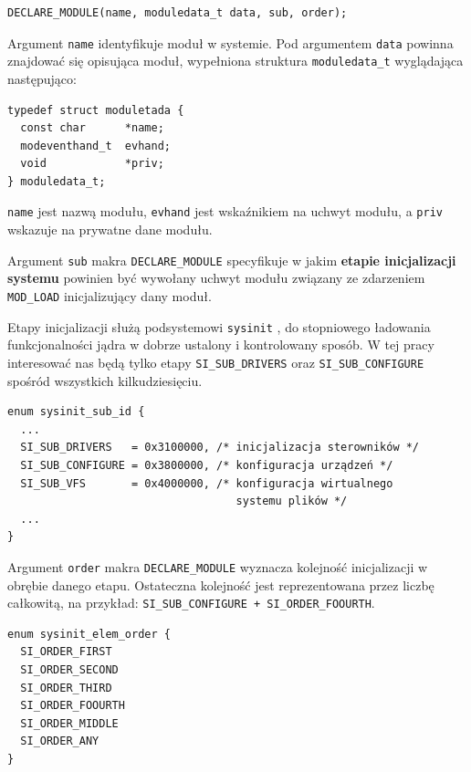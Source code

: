\documentclass[shortabstract,inz]{iithesis}
\begin{document}
\begin{lstlisting}
DECLARE_MODULE(name, moduledata_t data, sub, order);
\end{lstlisting}

Argument \texttt{name} identyfikuje moduł w systemie.
Pod argumentem \texttt{data} powinna znajdować się opisująca moduł, wypełniona struktura 
\texttt{moduledata\_t} wyglądająca następująco:

\begin{lstlisting}
typedef struct moduletada {
  const char      *name;
  modeventhand_t  evhand;
  void            *priv;
} moduledata_t;
\end{lstlisting}

\texttt{name} jest nazwą modułu, \texttt{evhand} jest wskaźnikiem na uchwyt modułu,
a \texttt{priv} wskazuje na prywatne dane modułu.

Argument \texttt{sub} makra \texttt{DECLARE\_MODULE} specyfikuje w jakim \textbf{etapie 
inicjalizacji systemu} powinien być wywołany uchwyt modułu związany ze zdarzeniem
\texttt{MOD\_LOAD} inicjalizujący dany moduł. 

Etapy inicjalizacji służą podsystemowi \texttt{sysinit} \cite{man:sysinit_9}, do stopniowego
ładowania funkcjonalności jądra w dobrze ustalony i kontrolowany sposób. 
W tej pracy interesować nas będą
tylko etapy \texttt{SI\_SUB\_DRIVERS} oraz \texttt{SI\_SUB\_CONFIGURE} spośród 
wszystkich kilkudziesięciu.

\begin{lstlisting}[caption={Etapy inicjalizacji systemu}, label={def:etapy_inicjalizacji}]
enum sysinit_sub_id {
  ...
  SI_SUB_DRIVERS   = 0x3100000, /* inicjalizacja sterowników */
  SI_SUB_CONFIGURE = 0x3800000, /* konfiguracja urządzeń */
  SI_SUB_VFS       = 0x4000000, /* konfiguracja wirtualnego 
                                   systemu plików */
  ...
}
\end{lstlisting}

Argument \texttt{order} makra \texttt{DECLARE\_MODULE} wyznacza kolejność 
inicjalizacji w obrębie danego etapu. Ostateczna kolejność jest reprezentowana 
przez liczbę całkowitą, na przykład: \texttt{SI\_SUB\_CONFIGURE + SI\_ORDER\_FOOURTH}.

\begin{lstlisting}[label={listing:elem_order}]
enum sysinit_elem_order {
  SI_ORDER_FIRST
  SI_ORDER_SECOND
  SI_ORDER_THIRD
  SI_ORDER_FOOURTH
  SI_ORDER_MIDDLE
  SI_ORDER_ANY
}
\end{lstlisting}
\end{document}
